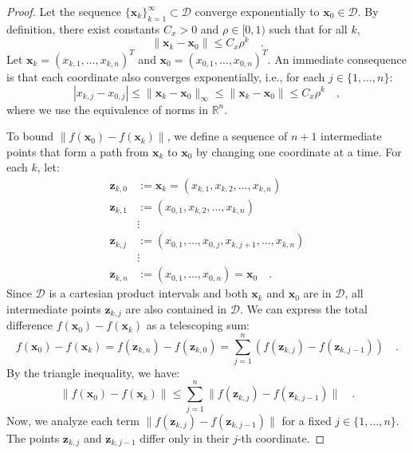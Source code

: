 \documentclass[../../main.tex]{subfiles}
\begin{document}
\begin{proof}
Let the sequence $\{\bm{x}_k\}_{k=1}^\infty \subset \mathcal{D}$ converge exponentially to $\bm{x}_0 \in \mathcal{D}$. By definition, there exist constants $C_x > 0$ and $\rho \in [0, 1)$ such that for all $k$,
\[
    \|\bm{x}_k - \bm{x}_0\| \le C_x \rho^k \quad .
\]
Let $\bm{x}_k = (x_{k,1}, \dots, x_{k,n})^T$ and $\bm{x}_0 = (x_{0,1}, \dots, x_{0,n})^T$. An immediate consequence is that each coordinate also converges exponentially, i.e., for each $j \in \{1, \dots, n\}$:
\[
    |x_{k,j} - x_{0,j}| \le \|\bm{x}_k - \bm{x}_0\|_{\infty} \le \|\bm{x}_k - \bm{x}_0\| \le C_x \rho^k \quad ,
\]
where we use the equivalence of norms in $\mathbb{R}^n$.

To bound $\|f(\bm{x}_0) - f(\bm{x}_k)\|$, we define a sequence of $n+1$ intermediate points that form a path from $\bm{x}_k$ to $\bm{x}_0$ by changing one coordinate at a time. For each $k$, let:
\begin{align*}
    \bm{z}_{k,0} &:= \bm{x}_k = (x_{k,1}, x_{k,2}, \dots, x_{k,n}) \\
    \bm{z}_{k,1} &:= (x_{0,1}, x_{k,2}, \dots, x_{k,n}) \\
    & \vdots \\
    \bm{z}_{k,j} &:= (x_{0,1}, \dots, x_{0,j}, x_{k,j+1}, \dots, x_{k,n}) \\
    & \vdots \\
    \bm{z}_{k,n} &:= (x_{0,1}, \dots, x_{0,n}) = \bm{x}_0 \quad .
\end{align*}
Since $\mathcal{D}$ is a cartesian product intervals and both $\bm{x}_k$ and $\bm{x}_0$ are in $\mathcal{D}$, all intermediate points $\bm{z}_{k,j}$ are also contained in $\mathcal{D}$. We can express the total difference $f(\bm{x}_0) - f(\bm{x}_k)$ as a telescoping sum:
\[
    f(\bm{x}_0) - f(\bm{x}_k) = f(\bm{z}_{k,n}) - f(\bm{z}_{k,0}) = \sum_{j=1}^{n} \left( f(\bm{z}_{k,j}) - f(\bm{z}_{k,j-1}) \right) \quad .
\]
By the triangle inequality, we have:
\[
    \|f(\bm{x}_0) - f(\bm{x}_k)\| \le \sum_{j=1}^{n} \|f(\bm{z}_{k,j}) - f(\bm{z}_{k,j-1})\| \quad .
\]
Now, we analyze each term $\|f(\bm{z}_{k,j}) - f(\bm{z}_{k,j-1})\|$ for a fixed $j \in \{1, \dots, n\}$. The points $\bm{z}_{k,j}$ and $\bm{z}_{k,j-1}$ differ only in their $j$-th coordinate.


\end{proof}
\end{document}
